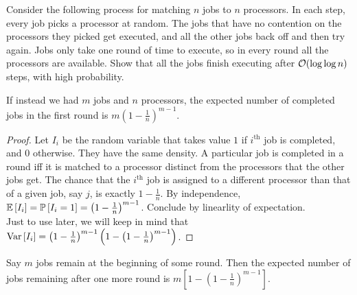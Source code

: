 \newpage
\pb
Consider the following process for matching $n$ jobs to $n$ processors. In each step, every job picks a processor at random. The jobs that have no contention on the processors they picked get executed, and all the other jobs back off and then try again. Jobs only take one round of time to execute, so in every round all the processors are available. Show that all the jobs finish executing after ${\mathcal{O}}(\log \log n)$ steps, with high probability.





\soln


\begin{cl}\label{complete}
If instead we had $m$ jobs and $n$ processors, the expected number of completed jobs in the first round is $m\left(1-\frac{1}{n}\right)^{m-1}$.
\end{cl}
\begin{proof}
Let $I_{i}$ be the random variable that takes value $1$ if $i^{\text{th}}$ job is completed, and $0$ otherwise. They have the same density. A particular job is completed in a round iff it is matched to a processor distinct from the processors that the other jobs get. The chance that the $i^{\text{th}}$ job is assigned to a different processor than that of a given job, say $j$, is exactly $1-\frac1n$. By independence, $\mathbb E\left[ I_{i} \right]=\mathbb P\left[ I_{i}=1 \right] = \left(1-\frac{1}{n}\right)^{m-1}$. Conclude by linearlity of expectation.\\
Just to use later, we will keep in mind that $\text{Var}\left[ I_{i} \right] = \left(1-\frac{1}{n}\right)^{m-1}\left(1-\left(1-\frac{1}{n}\right)^{m-1}\right)$.
\end{proof}

\begin{cor}\label{rem}
Say $m$ jobs remain at the beginning of some round. Then the expected number of jobs remaining after one more round is $m\left[1-\left(1-\frac{1}{n}\right)^{m-1}\right]$.
\end{cor}

